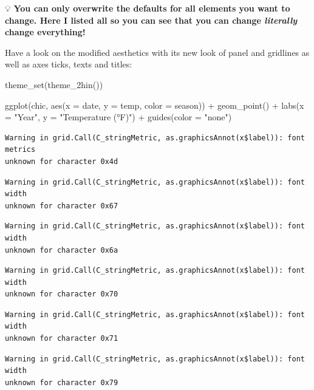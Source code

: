 \documentclass[
  letterpaper,
  DIV=11,
  numbers=noendperiod]{scrreprt}
\newenvironment{Shaded}{\begin{snugshade}}{\end{snugshade}}
\newcommand{\AttributeTok}[1]{\textcolor[rgb]{0.40,0.45,0.13}{#1}}
\newcommand{\FunctionTok}[1]{\textcolor[rgb]{0.28,0.35,0.67}{#1}}
\newcommand{\NormalTok}[1]{\textcolor[rgb]{0.00,0.23,0.31}{#1}}
\newcommand{\SpecialCharTok}[1]{\textcolor[rgb]{0.37,0.37,0.37}{#1}}
\newcommand{\StringTok}[1]{\textcolor[rgb]{0.13,0.47,0.30}{#1}}
\begin{document}
💡 \textbf{You can only overwrite the defaults for all elements you want
to change. Here I listed all so you can see that you can change
\emph{literally} change everything!}

Have a look on the modified aesthetics with its new look of panel and
gridlines as well as axes ticks, texts and titles:

\begin{Shaded}
\begin{Highlighting}[]
\FunctionTok{theme\_set}\NormalTok{(}\FunctionTok{theme\_2hin}\NormalTok{())}

\FunctionTok{ggplot}\NormalTok{(chic, }\FunctionTok{aes}\NormalTok{(}\AttributeTok{x =}\NormalTok{ date, }\AttributeTok{y =}\NormalTok{ temp, }\AttributeTok{color =}\NormalTok{ season)) }\SpecialCharTok{+}
  \FunctionTok{geom\_point}\NormalTok{() }\SpecialCharTok{+} \FunctionTok{labs}\NormalTok{(}\AttributeTok{x =} \StringTok{"Year"}\NormalTok{, }\AttributeTok{y =} \StringTok{"Temperature (°F)"}\NormalTok{) }\SpecialCharTok{+} \FunctionTok{guides}\NormalTok{(}\AttributeTok{color =} \StringTok{"none"}\NormalTok{)}
\end{Highlighting}
\end{Shaded}

\begin{verbatim}
Warning in grid.Call(C_stringMetric, as.graphicsAnnot(x$label)): font metrics
unknown for character 0x4d
\end{verbatim}

\begin{verbatim}
Warning in grid.Call(C_stringMetric, as.graphicsAnnot(x$label)): font width
unknown for character 0x67
\end{verbatim}

\begin{verbatim}
Warning in grid.Call(C_stringMetric, as.graphicsAnnot(x$label)): font width
unknown for character 0x6a
\end{verbatim}

\begin{verbatim}
Warning in grid.Call(C_stringMetric, as.graphicsAnnot(x$label)): font width
unknown for character 0x70
\end{verbatim}

\begin{verbatim}
Warning in grid.Call(C_stringMetric, as.graphicsAnnot(x$label)): font width
unknown for character 0x71
\end{verbatim}

\begin{verbatim}
Warning in grid.Call(C_stringMetric, as.graphicsAnnot(x$label)): font width
unknown for character 0x79
\end{verbatim}
\end{document}

